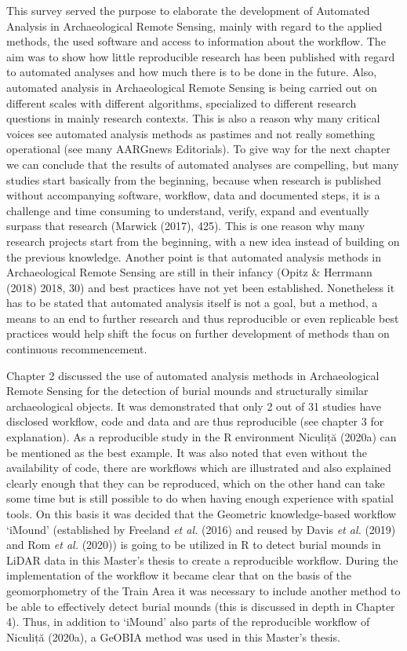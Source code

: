 \documentclass[
  12pt,
]{article}
\begin{document}
This survey served the purpose to elaborate the development of Automated Analysis in Archaeological Remote Sensing, mainly with regard to the applied methods, the used software and access to information about the workflow. The aim was to show how little reproducible research has been published with regard to automated analyses and how much there is to be done in the future. Also, automated analysis in Archaeological Remote Sensing is being carried out on different scales with different algorithms, specialized to different research questions in mainly research contexts. This is also a reason why many critical voices see automated analysis methods as pastimes and not really something operational (see many AARGnews Editorials). To give way for the next chapter we can conclude that the results of automated analyses are compelling, but many studies start basically from the beginning, because when research is published without accompanying software, workflow, data and documented steps, it is a challenge and time consuming to understand, verify, expand and eventually surpass that research (Marwick (2017), 425). This is one reason why many research projects start from the beginning, with a new idea instead of building on the previous knowledge. Another point is that automated analysis methods in Archaeological Remote Sensing are still in their infancy (Opitz \& Herrmann (2018) 2018, 30) and best practices have not yet been established. Nonetheless it has to be stated that automated analysis itself is not a goal, but a method, a means to an end to further research and thus reproducible or even replicable best practices would help shift the focus on further development of methods than on continuous recommencement.

Chapter 2 discussed the use of automated analysis methods in Archaeological Remote Sensing for the detection of burial mounds and structurally similar archaeological objects. It was demonstrated that only 2 out of 31 studies have disclosed workflow, code and data and are thus reproducible (see chapter 3 for explanation). As a reproducible study in the R environment Niculiță (2020a) can be mentioned as the best example. It was also noted that even without the availability of code, there are workflows which are illustrated and also explained clearly enough that they can be reproduced, which on the other hand can take some time but is still possible to do when having enough experience with spatial tools.
On this basis it was decided that the Geometric knowledge-based workflow `iMound' (established by Freeland \emph{et al.} (2016) and reused by Davis \emph{et al.} (2019) and Rom \emph{et al.} (2020)) is going to be utilized in R to detect burial mounds in LiDAR data in this Master's thesis to create a reproducible workflow. During the implementation of the workflow it became clear that on the basis of the geomorphometry of the Train Area it was necessary to include another method to be able to effectively detect burial mounds (this is discussed in depth in Chapter 4). Thus, in addition to `iMound' also parts of the reproducible workflow of Niculiță (2020a), a GeOBIA method was used in this Master's thesis.
\end{document}
